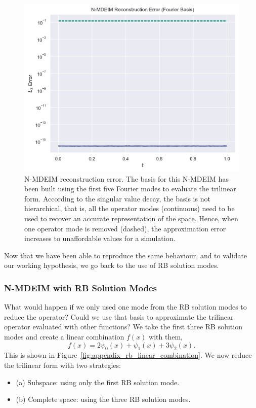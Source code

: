 \documentclass[../../thesis.tex]{subfiles}
\begin{document}
\begin{figure}[h]
    \includegraphics[width=\columnwidth]{research_project/piston/figures/svd_fourier/fourier_basis_mdeim_truncation_errors_comparison.png}
    \caption{N-MDEIM reconstruction error.
    The basis for this N-MDEIM has been built using 
    the first five Fourier modes to evaluate the trilinear form.
    According to the singular value decay, the basis is not hierarchical, 
    that is, all the operator modes (continuous) need to be used to 
    recover an accurate representation of the space.
    Hence, when one operator mode is removed (dashed), 
    the approximation error increases to unaffordable values for a simulation.}
    \label{fig:appendix_fourier_nmdeim_reconstruction_error}
\end{figure}
Now that we have been able to reproduce the same behaviour, 
and to validate our working hypothesis,
we go back to the use of RB solution modes.

\newpage
\subsubsection{N-MDEIM with RB Solution Modes}
\label{sec:nmdeim_one_mode}
What would happen if we only used one mode from the RB solution modes to reduce the operator?
Could we use that basis to approximate the trilinear operator evaluated with other functions?
We take the first three RB solution modes 
and create a linear combination $f(x)$ with them,
\begin{equation}
    f(x) = 2 \psi_0(x) + \psi_1(x) + 3 \psi_2(x).
\end{equation} 
This is shown in Figure~\ref{fig:appendix_rb_linear_combination}.
We now reduce the trilinear form with two strategies:
\begin{itemize}
    \item (a) Subspace: using only the first RB solution mode.
    \item (b) Complete space: using the three RB solution modes.
\end{itemize}
\end{document}
